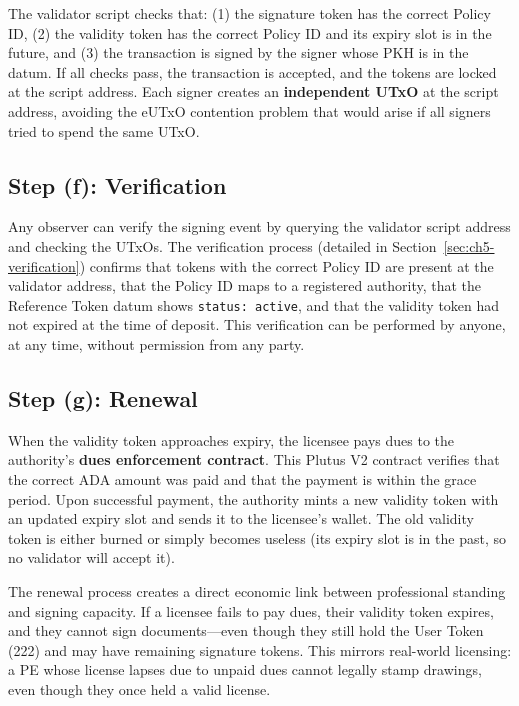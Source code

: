The validator script checks that: (1) the signature token has the correct Policy ID, (2) the validity token has the correct Policy ID and its expiry slot is in the future, and (3) the transaction is signed by the signer whose PKH is in the datum. If all checks pass, the transaction is accepted, and the tokens are locked at the script address. Each signer creates an \textbf{independent UTxO} at the script address, avoiding the eUTxO contention problem that would arise if all signers tried to spend the same UTxO.

\subsection{Step (f): Verification}

Any observer can verify the signing event by querying the validator script address and checking the UTxOs. The verification process (detailed in Section~\ref{sec:ch5-verification}) confirms that tokens with the correct Policy ID are present at the validator address, that the Policy ID maps to a registered authority, that the Reference Token datum shows \texttt{status: active}, and that the validity token had not expired at the time of deposit. This verification can be performed by anyone, at any time, without permission from any party.

\subsection{Step (g): Renewal}

When the validity token approaches expiry, the licensee pays dues to the authority's \textbf{dues enforcement contract}. This Plutus V2 contract verifies that the correct ADA amount was paid and that the payment is within the grace period. Upon successful payment, the authority mints a new validity token with an updated expiry slot and sends it to the licensee's wallet. The old validity token is either burned or simply becomes useless (its expiry slot is in the past, so no validator will accept it).

The renewal process creates a direct economic link between professional standing and signing capacity. If a licensee fails to pay dues, their validity token expires, and they cannot sign documents---even though they still hold the User Token (222) and may have remaining signature tokens. This mirrors real-world licensing: a PE whose license lapses due to unpaid dues cannot legally stamp drawings, even though they once held a valid license.

